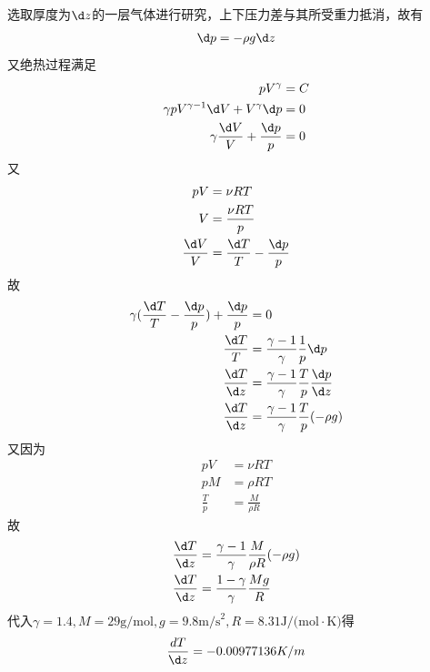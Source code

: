 \documentclass{phyasgn}
\begin{document}
\begin{sol}[3]
    选取厚度为$\d z$的一层气体进行研究，上下压力差与其所受重力抵消，故有
    \begin{align*}
        \d p=-\rho g\d z
    \end{align*}
    又绝热过程满足
    \begin{align*}
        pV^\gamma&=C\\
        \gamma pV^{\gamma-1}\d V+V^\gamma\d p&=0\\
        \gamma\frac{\d V}{V}+\frac{\d p}{p}&=0
    \end{align*}
    又
    \begin{align*}
        p V&=\nu RT\\
        V&=\frac{\nu RT}{p}\\
        \frac{\d V}{V}&=\frac{\d T}{T}-\frac{\d p}{p}
    \end{align*}
    故
    \begin{align*}
        \gamma(\frac{\d T}{T}-\frac{\d p}{p})+\frac{\d p}{p}&=0\\
        \frac{\d T}{T}&=\frac{\gamma-1}{\gamma}\frac{1}{p}\d p\\
        \frac{\d T}{\d z}&=\frac{\gamma-1}{\gamma}\frac{T}{p}\frac{\d p}{\d z}\\
        \frac{\d T}{\d z}&=\frac{\gamma-1}{\gamma}\frac{T}{p}(-\rho g)\\
    \end{align*}
    又因为
    \begin{align*}
        pV&=\nu RT\\
        pM&=\rho RT\\
        \frac{T}{p}&=\frac{M}{\rho R}
    \end{align*}
    故
    \begin{align*}
        \frac{\d T}{\d z}&=\frac{\gamma-1}{\gamma}\frac{M}{\rho R}(-\rho g)\\
        \frac{\d T}{\d z}&=\frac{1-\gamma}{\gamma}\frac{Mg}{R}
    \end{align*}
    代入$\gamma=1.4,M=29\text{g/mol},g=9.8\text{m/s}^2,R=8.31\text{J/(mol}\cdot \text{K)}$得
    \begin{align*}
        \frac{d T}{\d z}=-0.00977136K/m
    \end{align*}
\end{sol}\par
\end{document}
